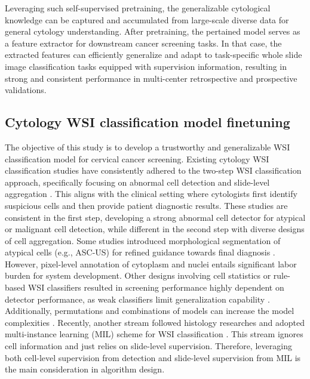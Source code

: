 Leveraging such self-supervised pretraining, the generalizable cytological knowledge can be captured and accumulated from large-scale diverse data for general cytology understanding. After pretraining, the pertained model serves as a feature extractor for downstream cancer screening tasks. In that case, the extracted features can efficiently generalize and adapt to task-specific whole slide image classification tasks equipped with supervision information, resulting in strong and consistent performance in multi-center retrospective and prospective validations.

\subsection*{Cytology WSI classification model finetuning}\label{subsec4-4}
The objective of this study is to develop a trustworthy and generalizable WSI classification model for cervical cancer screening. 
Existing cytology WSI classification studies have consistently adhered to the two-step WSI classification approach, specifically focusing on abnormal cell detection and slide-level aggregation \cite{lin2021dual,wang2024artificial,zhu2021hybrid,yu2023ai}. This aligns with the clinical setting where cytologists first identify suspicious cells and then provide patient diagnostic results. 
These studies are consistent in the first step, developing a strong abnormal cell detector for atypical or malignant cell detection, while different in the second step with diverse designs of cell aggregation. Some studies introduced morphological segmentation of atypical cells (e.g., ASC-US) for refined guidance towards final diagnosis \cite{zhu2021hybrid,yu2023ai}. However, pixel-level annotation of cytoplasm and nuclei entails significant labor burden for system development. 
Other designs involving cell statistics or rule-based WSI classifiers resulted in screening performance highly dependent on detector performance, as weak classifiers limit generalization capability \cite{lin2021dual,wang2024artificial}. Additionally, permutations and combinations of models can increase the model complexities \cite{zhu2021hybrid,wu2024development}. Recently, another stream followed histology researches and adopted multi-instance learning (MIL) scheme for WSI classification \cite{zhao2024less,jin2024hmil}. 
This stream ignores cell information and just relies on slide-level supervision. Therefore, leveraging both cell-level supervision from detection and slide-level supervision from MIL is the main consideration in algorithm design. 

